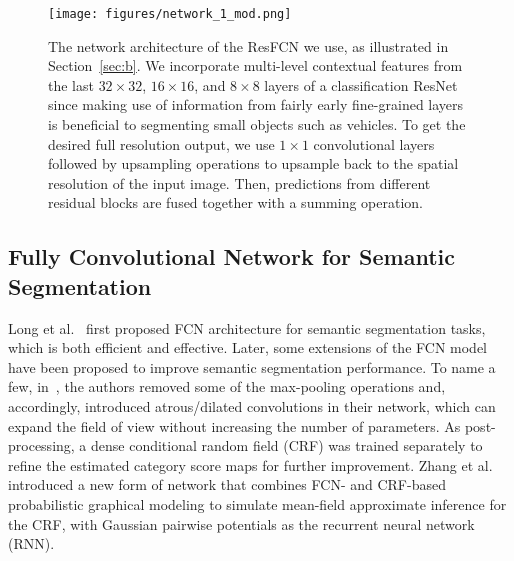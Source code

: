 \documentclass[journal]{IEEEtran}
\begin{document}
\begin{figure*}[t]
\centering
\texttt{[image: figures/network\_1\_mod.png]}
\renewcommand{\figurename}{Fig}
\caption{\label{fig:network1} The network architecture of the ResFCN we use, as illustrated in Section~\ref{sec:b}. We incorporate multi-level contextual features from the last $32\times32$, $16\times16$, and $8\times8$ layers of a classification ResNet since making use of information from fairly early fine-grained layers is beneficial to segmenting small objects such as vehicles. To get the desired full resolution output, we use $1\times1$ convolutional layers followed by upsampling operations to upsample back to the spatial resolution of the input image. Then, predictions from different residual blocks are fused together with a summing operation.}
\end{figure*}

\subsection{Fully Convolutional Network for Semantic Segmentation}
\label{sec:a}
Long et al.~\cite{FCN} first proposed FCN architecture for semantic segmentation tasks, which is both efficient and effective. Later, some extensions of the FCN model have been proposed to improve semantic segmentation performance. To name a few, in~\cite{deepLab}, the authors removed some of the max-pooling operations and, accordingly, introduced atrous/dilated convolutions in their network, which can expand the field of view without increasing the number of parameters. As post-processing, a dense conditional random field (CRF) was trained separately to refine the estimated category score maps for further improvement. Zhang et al.~\cite{CRF-RNN} introduced a new form of network that combines FCN- and CRF-based probabilistic graphical modeling to simulate mean-field approximate inference for the CRF, with Gaussian pairwise potentials as the recurrent neural network (RNN).
\end{document}
